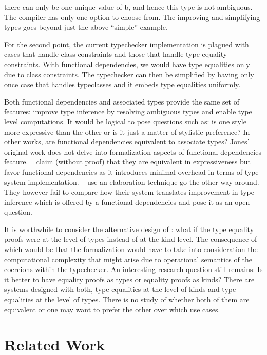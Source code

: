 \documentclass[screen,nonacm,manuscript,review]{acmart} %
\begin{document}
there can only be one unique value of b, and hence this type is not
ambiguous. The compiler has only one option to choose from.
The improving and simplifying types goes beyond just the above
``simple'' example.

For the second point, the current typechecker implementation is
plagued with cases that handle class constraints and those that handle
type equality constraints. With functional dependencies, we would have
type equalities only due to class constraints. The typechecker can
then be simplified by having only once case that handles typeclasses
and it embeds type equalities uniformly. 

Both functional dependencies and associated types provide the same set
of features: improve type inference by resolving ambiguous types and
enable type level computations. It would be logical to pose
questions such as: is one style more expressive than the other or is
it just a matter of stylistic preference? In other works, are
functional dependencies equivalent to associate types? Jones' original
work does not delve into formalization aspects of functional
dependencies feature. ~\citet{jones_language_2008} claim (without
proof) that they  are equivalent in expressiveness but favor
functional dependencies as it introduces minimal overhead in terms of
type system implementation. ~\citet{karachalias_elaboration_2017} use
an elaboration technique go the other way around. They however fail to
compare how their system translates improvement in type inference
which is offered by a functional dependencies and pose it as an open
question.


It is worthwhile to consider the alternative design of \SFC: what if
the type equality proofs were at the level of types instead of at the kind
level. The consequence of which would be that the formalization would
have to take into consideration the computational complexity that
might arise due to operational semantics of the coercions within the
typechecker. An interesting research question still remains: Is it
better to have equality proofs as types or equality proofs as kinds?
There are systems designed with both, type equalities at the level of
kinds and type equalities at the level of types. There is no study of
whether both of them are equivalent or one may want to prefer the
other over which use cases.

\section{Related Work}\label{sec:related-work}
\end{document}
